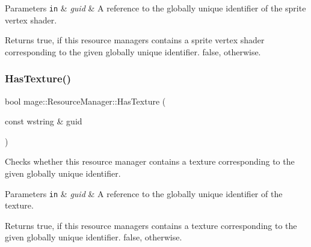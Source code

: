 \begin{DoxyParams}[1]{Parameters}
\mbox{\tt in}  & {\em guid} & A reference to the globally unique identifier of the sprite vertex shader. \\
\hline
\end{DoxyParams}
\begin{DoxyReturn}{Returns}
{\ttfamily true}, if this resource managers contains a sprite vertex shader corresponding to the given globally unique identifier. {\ttfamily false}, otherwise. 
\end{DoxyReturn}
\hypertarget{classmage_1_1_resource_manager_a617768fb9ec0c7c8f00b3f34c6386dfa}{}\label{classmage_1_1_resource_manager_a617768fb9ec0c7c8f00b3f34c6386dfa} 
\subsubsection{\texorpdfstring{Has\+Texture()}{HasTexture()}}
{\footnotesize\ttfamily bool mage\+::\+Resource\+Manager\+::\+Has\+Texture (\begin{DoxyParamCaption}\item[{const wstring \&}]{guid }\end{DoxyParamCaption})\hspace{0.3cm}{\ttfamily [noexcept]}}

Checks whether this resource manager contains a texture corresponding to the given globally unique identifier.


\begin{DoxyParams}[1]{Parameters}
\mbox{\tt in}  & {\em guid} & A reference to the globally unique identifier of the texture. \\
\hline
\end{DoxyParams}
\begin{DoxyReturn}{Returns}
{\ttfamily true}, if this resource managers contains a texture corresponding to the given globally unique identifier. {\ttfamily false}, otherwise. 
\end{DoxyReturn}
\hypertarget{classmage_1_1_resource_manager_a3aeb6ce19c392b82fd4268525478fc3d}{}\label{classmage_1_1_resource_manager_a3aeb6ce19c392b82fd4268525478fc3d} 
